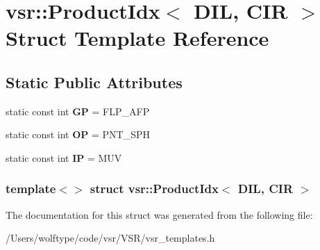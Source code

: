 \hypertarget{structvsr_1_1_product_idx_3_01_d_i_l_00_01_c_i_r_01_4}{\section{vsr\-:\-:Product\-Idx$<$ D\-I\-L, C\-I\-R $>$ Struct Template Reference}
\label{structvsr_1_1_product_idx_3_01_d_i_l_00_01_c_i_r_01_4}
}
\subsection*{Static Public Attributes}
\begin{DoxyCompactItemize}
\item 
\hypertarget{structvsr_1_1_product_idx_3_01_d_i_l_00_01_c_i_r_01_4_ae84fe7577d5dcfc8b808d8dd1598ae85}{static const int {\bfseries G\-P} = F\-L\-P\-\_\-\-A\-F\-P}\label{structvsr_1_1_product_idx_3_01_d_i_l_00_01_c_i_r_01_4_ae84fe7577d5dcfc8b808d8dd1598ae85}

\item 
\hypertarget{structvsr_1_1_product_idx_3_01_d_i_l_00_01_c_i_r_01_4_a496b2b902bfdbdb9e6ee6b0335cdc94f}{static const int {\bfseries O\-P} = P\-N\-T\-\_\-\-S\-P\-H}\label{structvsr_1_1_product_idx_3_01_d_i_l_00_01_c_i_r_01_4_a496b2b902bfdbdb9e6ee6b0335cdc94f}

\item 
\hypertarget{structvsr_1_1_product_idx_3_01_d_i_l_00_01_c_i_r_01_4_a50774caaec705a24108b80f772cdfe9d}{static const int {\bfseries I\-P} = M\-U\-V}\label{structvsr_1_1_product_idx_3_01_d_i_l_00_01_c_i_r_01_4_a50774caaec705a24108b80f772cdfe9d}

\end{DoxyCompactItemize}
\subsubsection*{template$<$$>$ struct vsr\-::\-Product\-Idx$<$ D\-I\-L, C\-I\-R $>$}



The documentation for this struct was generated from the following file\-:\begin{DoxyCompactItemize}
\item 
/\-Users/wolftype/code/vsr/\-V\-S\-R/vsr\-\_\-templates.\-h\end{DoxyCompactItemize}
